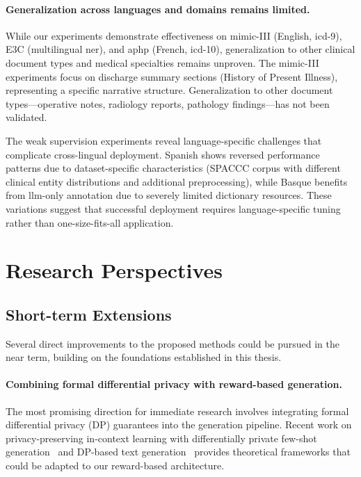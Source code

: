 \paragraph{Generalization across languages and domains remains limited.}

While our experiments demonstrate effectiveness on \gls{mimic}-III (English, \gls{icd}-9), E3C (multilingual \gls{ner}), and \gls{aphp} (French, \gls{icd}-10), generalization to other clinical document types and medical specialties remains unproven.
The \gls{mimic}-III experiments focus on discharge summary sections (History of Present Illness), representing a specific narrative structure.
Generalization to other document types—operative notes, radiology reports, pathology findings—has not been validated.

The weak supervision experiments reveal language-specific challenges that complicate cross-lingual deployment.
Spanish shows reversed performance patterns due to dataset-specific characteristics (SPACCC corpus with different clinical entity distributions and additional preprocessing), while Basque benefits from \gls{llm}-only annotation due to severely limited dictionary resources.
These variations suggest that successful deployment requires language-specific tuning rather than one-size-fits-all application.

\section{Research Perspectives}

\subsection{Short-term Extensions}

Several direct improvements to the proposed methods could be pursued in the near term, building on the foundations established in this thesis.

\paragraph{Combining formal differential privacy with reward-based generation.}

The most promising direction for immediate research involves integrating formal differential privacy (DP) guarantees into the generation pipeline.
Recent work on privacy-preserving in-context learning with differentially private few-shot generation~\cite{tangPrivacyPreservingInContextLearning2023} and DP-based text generation~\cite{nageshPrivateTextGeneration2025} provides theoretical frameworks that could be adapted to our reward-based architecture.

